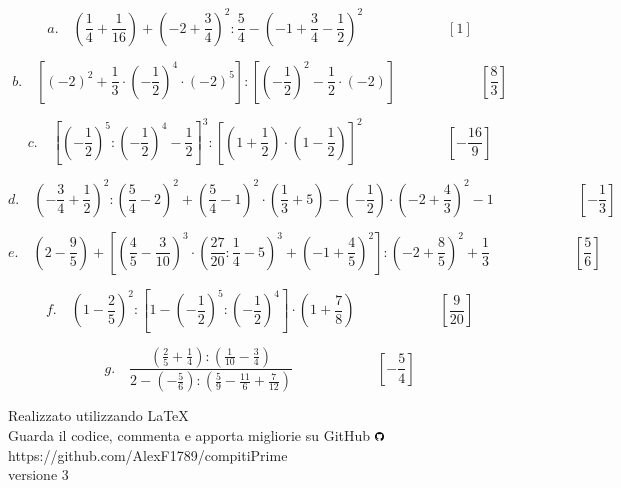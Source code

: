 \documentclass[]{article}
\begin{document}
\begin{enumerate}
		\[a.\quad\left(\frac14+\frac1{16}\right)+\left(-2+\frac34\right)^2:\frac54-\left(-1+\frac34-\frac12\right)^2\qquad\qquad\qquad\left[1\right]\]
		
		\[b.\quad\left[(-2)^2+\frac13\cdot\left(-\frac12\right)^4\cdot(-2)^5\right]:\left[\left(-\frac12\right)^2-\frac12\cdot(-2)\right]\qquad\qquad\qquad\left[\frac83\right]\]
		
		\[c.\quad\left[\left(-\frac12\right)^5:\left(-\frac12\right)^4-\frac12\right]^3:\left[\left(1+\frac12\right)\cdot\left(1-\frac12\right)\right]^2\qquad\qquad\qquad\left[-\frac{16}9\right]\]
		
		\[d.\quad\left(-\frac34+\frac12\right)^2:\left(\frac54-2\right)^2+\left(\frac54-1\right)^2\cdot\left(\frac13+5\right)-\left(-\frac12\right)\cdot\left(-2+\frac43\right)^2-1\qquad\qquad\qquad\left[-\frac13\right]\]
		
		\[e.\quad\left(2-\frac95\right)+\left[\left(\frac45-\frac3{10}\right)^3\cdot\left(\frac{27}{20}:\frac14-5\right)^3+\left(-1+\frac45\right)^2\right]:\left(-2+\frac85\right)^2+\frac13\qquad\qquad\qquad\left[\frac56\right]\]
		
		\[f.\quad\left(1-\frac25\right)^2:\left[1-\left(-\frac12\right)^5:\left(-\frac12\right)^4\right]\cdot\left(1+\frac78\right)\qquad\qquad\qquad\left[\frac9{20}\right]\]
		
		\[g.\quad\frac{\left(\frac25+\frac14\right):\left(\frac1{10}-\frac34\right)}{2-\left(-\frac56\right):\left(\frac59-\frac{11}6+\frac7{12}\right)}\qquad\qquad\qquad\left[-\frac54\right]\]
		
		
\end{enumerate}

\vfill

\begin{center}
	Realizzato utilizzando \LaTeX \\ Guarda il codice, commenta e apporta migliorie su GitHub \includegraphics[height=0.25cm]{git} \\ \parskip=25pt
\tiny{https://github.com/AlexF1789/compitiPrime} \\
\vspace*{1cm}versione 3
\end{center}
\end{document}
